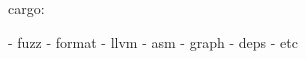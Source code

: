 \begin{frame}{\insertsubsection}
  cargo:

  - fuzz
  - format
  - llvm
  - asm
  - graph
  - deps
  - etc

  \note {


  }

\end{frame}